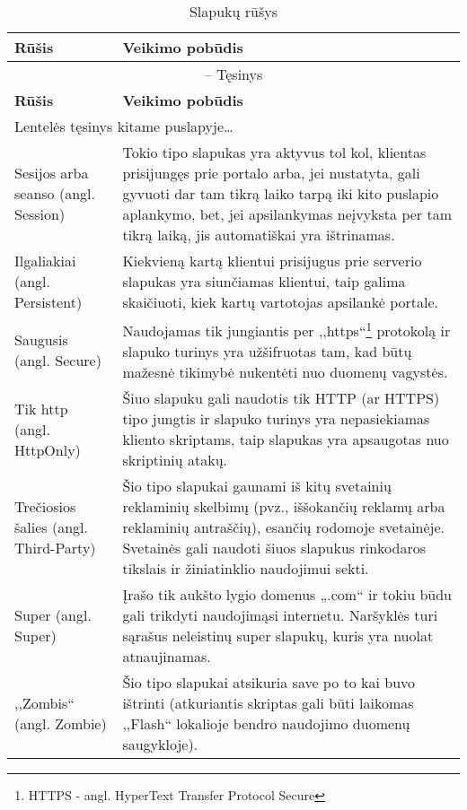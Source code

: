 \documentclass[12pt,a4paper,titlepage]{article}
\begin{document}
\begin{longtable}{|p{4cm}|p{8.8cm}|}
\caption{Slapukų rūšys \label{table:slapuku_rusys}}\\

\hline \hline
{\textbf{Rūšis}} &
{\textbf{Veikimo pobūdis}}\\
\hline
\endfirsthead


\multicolumn{2}{c}{{\tablename} \thetable{} -- Tęsinys} \\[0.5ex]
\hline \hline
{\textbf{Rūšis}} &
{\textbf{Veikimo pobūdis}}\\
\hline
\endhead


\multicolumn{2}{l}{{Lentelės tęsinys kitame puslapyje\ldots}} \\
\endfoot


\hline \hline
\endlastfoot
\hline 
Sesijos arba seanso  (angl. Session)
&
Tokio tipo slapukas yra aktyvus tol kol, klientas prisijungęs prie portalo arba, jei nustatyta, gali gyvuoti dar tam tikrą laiko tarpą iki kito puslapio aplankymo, bet, jei apsilankymas neįvyksta per tam tikrą laiką, jis automatiškai yra ištrinamas.
\\
\hline
Ilgaliakiai (angl. Persistent)
&
Kiekvieną kartą klientui prisijugus prie serverio slapukas yra siunčiamas klientui, taip galima skaičiuoti, kiek kartų vartotojas apsilankė portale.
\\
\hline
Saugusis (angl. Secure)
&
Naudojamas tik jungiantis per ,,https``\footnote{HTTPS - angl. HyperText Transfer Protocol Secure} protokolą ir slapuko turinys yra užšifruotas tam, kad būtų mažesnė tikimybė nukentėti nuo duomenų vagystės.
\\
\hline
Tik http (angl. HttpOnly)
&
Šiuo slapuku gali naudotis tik HTTP (ar HTTPS) tipo jungtis ir slapuko turinys yra nepasiekiamas kliento skriptams, taip slapukas yra apsaugotas nuo skriptinių atakų.
\\
\hline
Trečiosios šalies (angl. Third-Party)
&
Šio tipo slapukai gaunami iš kitų svetainių reklaminių skelbimų (pvz., iššokančių reklamų arba reklaminių antraščių), esančių rodomoje svetainėje. Svetainės gali naudoti šiuos slapukus rinkodaros tikslais ir žiniatinklio naudojimui sekti.
\\
\hline
Super (angl. Super)
&
Įrašo tik aukšto lygio domenus „.com“ ir tokiu būdu gali trikdyti naudojimąsi internetu. Naršyklės turi sąrašus neleistinų super slapukų, kuris yra nuolat atnaujinamas.
\\
\hline
,,Zombis`` (angl. Zombie)
&
Šio tipo slapukai atsikuria save po to kai buvo ištrinti (atkuriantis skriptas gali būti laikomas ,,Flash`` lokalioje bendro naudojimo duomenų saugykloje).
\end{longtable}
\end{document}
